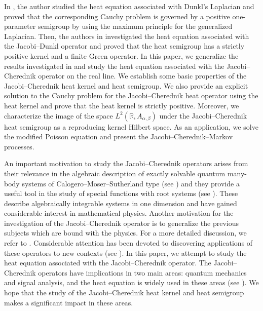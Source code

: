 \documentclass[a4paper,11pt, reqno]{amsart}
\theoremstyle{plain}
\theoremstyle{definition}
\theoremstyle{remark}
\begin{document}
In \cite{ros98}, the author studied the heat equation associated with Dunkl's Laplacian and proved that the corresponding Cauchy problem is governed by a positive one-parameter semigroup by using the maximum principle for the generalized Laplacian. Then, the authors in \cite{chou06} investigated the heat equation associated with the Jacobi--Dunkl operator and proved that the heat semigroup has a strictly positive kernel and a finite Green operator. In this paper, we generalize the results investigated in \cite{ros98, chou06} and study the heat equation associated with the Jacobi--Cherednik operator on the real line. We establish some basic properties of the Jacobi--Cherednik heat kernel and heat semigroup. We also provide an explicit solution to the Cauchy problem for the Jacobi--Cherednik heat operator using the heat kernel and prove that the heat kernel is strictly positive. Moreover, we characterize the image of the space $L^2(\mathbb R, A_{\alpha, \beta})$ under the Jacobi--Cherednik heat semigroup as a reproducing kernel Hilbert space. As an application, we solve the modified Poisson equation and present the Jacobi--Cherednik--Markov processes.

An important motivation to study the Jacobi--Cherednik operators arises from their relevance in the algebraic description of exactly solvable quantum many-body systems of Calogero--Moser--Sutherland type (see \cite{die00, hik96}) and they provide a useful tool in the study of special functions with root systems (see \cite{dun91, hec91}). These describe algebraically integrable systems in one dimension and have gained considerable interest in mathematical physics. Another motivation for the investigation of the Jacobi--Cherednik operator is to generalize the previous subjects which are bound with the physics. For a more detailed discussion, we refer to \cite{mon221, por23}. Considerable attention has been devoted to discovering applications of these operators to new contexts (see \cite{mej14, mon222, mon223, mon23, por21}). In this paper, we attempt to study the heat equation associated with the Jacobi--Cherednik operator. The Jacobi--Cherednik operators have implications in two main areas: quantum mechanics and signal analysis, and the heat equation is widely used in these areas (see \cite{hik96, ros98}). We hope that the study of the Jacobi--Cherednik heat kernel and heat semigroup makes a significant impact in these areas.
\end{document}
